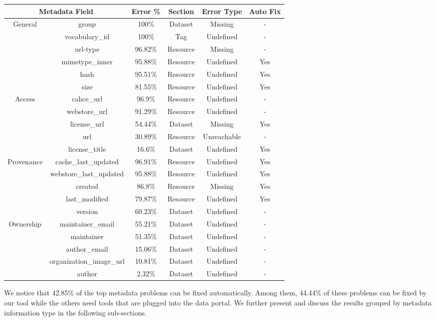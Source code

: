 \begin{table}[ht]
\begin{center}
\begin{tabular}{|c|c|c|c|c|c|}
\hline
\multicolumn{2}{|c|}{Metadata Field} & Error \% & Section & Error Type & Auto Fix\tabularnewline
\hline
\hline
\multirow{6}{*}{General } & group & 100\% & Dataset & Missing & -\tabularnewline
\cline{2-6}
 & vocabulary\_id & 100\% & Tag & Undefined & -\tabularnewline
\cline{2-6}
 & url-type & 96.82\% & Resource & Missing & -\tabularnewline
\cline{2-6}
 & mimetype\_inner & 95.88\% & Resource & Undefined & Yes\tabularnewline
\cline{2-6}
 & hash & 95.51\% & Resource & Undefined & Yes\tabularnewline
\cline{2-6}
 & size & 81.55\% & Resource & Undefined & Yes\tabularnewline
\hline
\multirow{5}{*}{Access } & cahce\_url & 96.9\% & Resource & Undefined & -\tabularnewline
\cline{2-6}
 & webstore\_url & 91.29\% & Resource & Undefined & -\tabularnewline
\cline{2-6}
 & license\_url & 54.44\% & Dataset & Missing & Yes\tabularnewline
\cline{2-6}
 & url & 30.89\% & Resource & Unreachable & -\tabularnewline
\cline{2-6}
 & license\_title & 16.6\% & Dataset & Undefined & Yes\tabularnewline
\hline
\multirow{5}{*}{Provenance } & cache\_last\_updated & 96.91\% & Resource & Undefined & Yes\tabularnewline
\cline{2-6}
 & webstore\_last\_updated & 95.88\% & Resource & Undefined & Yes\tabularnewline
\cline{2-6}
 & created & 86.8\% & Resource & Missing & Yes\tabularnewline
\cline{2-6}
 & last\_modified & 79.87\% & Resource & Undefined & Yes\tabularnewline
\cline{2-6}
 & version & 60.23\% & Dataset & Undefined & -\tabularnewline
\hline
\multirow{5}{*}{Ownership } & maintainer\_email & 55.21\% & Dataset & Undefined & -\tabularnewline
\cline{2-6}
 & maintainer & 51.35\% & Dataset & Undefined & -\tabularnewline
\cline{2-6}
 & author\_email & 15.06\% & Dataset & Undefined & -\tabularnewline
\cline{2-6}
 & organization\_image\_url & 10.81\% & Dataset & Undefined & -\tabularnewline
\cline{2-6}
 & author & 2.32\% & Dataset & Undefined & -\tabularnewline
\hline
\end{tabular}
\label{table:top_metadata_fields_errors}
\end{center}
\end{table}

We notice that 42.85\% of the top metadata problems can be fixed automatically. Among them, 44.44\% of these problems can be fixed by our tool while the others need tools that are plugged into the data portal. We further present and discuss the results grouped by metadata information type in the following sub-sections.

